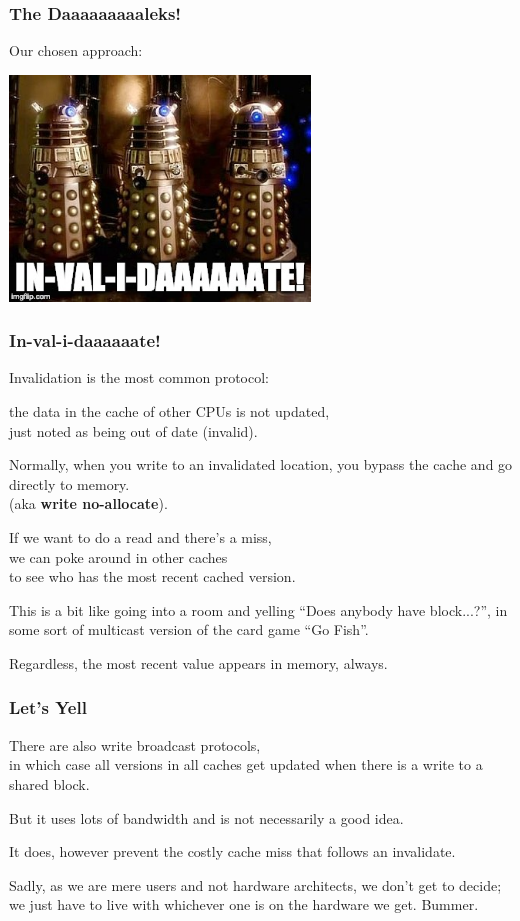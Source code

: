 \begin{frame}
\frametitle{The Daaaaaaaaaleks!}
\Large

Our chosen approach:

\begin{center}
\includegraphics[width=0.6\textwidth]{images/dalek-invalidate.jpg}
\end{center}

\end{frame}



\begin{frame}
\frametitle{In-val-i-daaaaaate!}
\large

Invalidation is the most common protocol:

\qquad the data in the cache of other CPUs is not updated, \\
\qquad just noted as being out of date (invalid).  

Normally, when you write to an invalidated location, you bypass the cache and go directly to memory.\\
\qquad \qquad (aka {\bf write no-allocate}). 

If we want to do a read and there's a miss, \\
we can poke around in other caches \\
to see who has the most recent cached version. 

This is a bit like going into a room and yelling ``Does anybody have block...?'', in some sort of multicast version of the card game ``Go Fish''. 

Regardless, the most recent value appears in memory, always.


\end{frame}



\begin{frame}
\frametitle{Let's Yell}
\Large

There are also write broadcast protocols, \\
in which case all versions in all caches get updated when there is a write to a shared block. 

But it uses lots of bandwidth and is not necessarily a good idea. 

It does, however prevent the costly cache miss that follows an invalidate. 

Sadly, as we are mere users and not hardware architects, we don't get to decide; we just have to live with whichever one is on the hardware we get. Bummer.


\end{frame}

